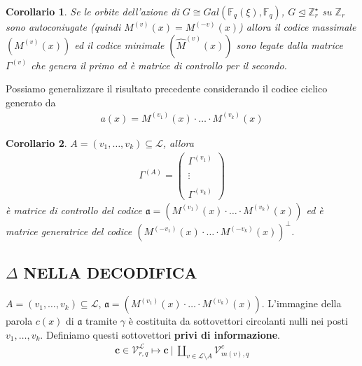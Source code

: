 \documentclass[mathserif]{beamer}
\newtheorem{corollario}{Corollario}
\begin{document}
\begin{frame}
    \begin{corollario}
      Se le orbite dell'azione di $G \cong Gal(\mathbb{F}_{q}(\xi),\mathbb{F}_{q})$, $G \trianglelefteq \mathbb{Z}_{r}^{\star} $ su $\mathbb{Z}_{r}$ sono autoconiugate (quindi $M^{(v)}(x) = M^{(-v)}(x)$) allora il codice massimale $(M^{(v)}(x))$ ed il codice minimale $(\hat{M}^{(v)}(x))$ sono legate dalla matrice $\Gamma^{(v)}$ che genera il primo ed è matrice di controllo per il secondo.
    \end{corollario}
    \vspace{1cm}
    Possiamo generalizzare il risultato precedente considerando il codice ciclico generato da 
    \begin{align*}
      a(x) = M^{(v_{1})}(x)\cdot \dots \cdot M^{(v_{k})}(x)
    \end{align*}
\end{frame}
\begin{frame}
    \begin{corollario}
      $A=(v_{1}, \dots, v_{k}) \subseteq \mathscr{L}$, allora
      \begin{align*}
	  \Gamma^{(A)}
	  =
	  \left(
	  \begin{array} { c }
	  \Gamma^{(v_{1})}  \\ \\
	  \vdots \\ \\
	  \Gamma^{(v_{k})} 
	  \end{array}
	  \right)
      \end{align*}
      è matrice di controllo del codice $\mathfrak{a} = (  M^{(v_{1})}(x)\cdot \dots \cdot M^{(v_{k})}(x) )$
      ed è matrice generatrice del codice $(  M^{(-v_{1})}(x)\cdot \dots \cdot M^{(-v_{k})}(x) )^{\perp}$.
    \end{corollario}
\end{frame}




\subsection{$\Delta$ NELLA DECODIFICA}
\begin{frame}
   $A=(v_{1}, \dots, v_{k}) \subseteq \mathscr{L}$, $\mathfrak{a} = (  M^{(v_{1})}(x)\cdot \dots \cdot M^{(v_{k})}(x) )$.
   L'immagine della parola $c(x)$ di $\mathfrak{a}$ tramite $\gamma$ è costituita da sottovettori circolanti nulli nei posti $v_{1}, \dots, v_{k}$. Definiamo questi sottovettori {\bf privi di informazione}.
    \begin{align*}
      \mathbf{c} \in \mathcal{V}_{r, q}^{\mathscr{L}} 
      \mapsto 
      \mathbf{c} ~ \Bigg|~ \coprod_{v\in \mathscr{L} \setminus A} \mathcal{V}_{m(v), q}^{c}
    \end{align*}
\end{frame}
\end{document}
